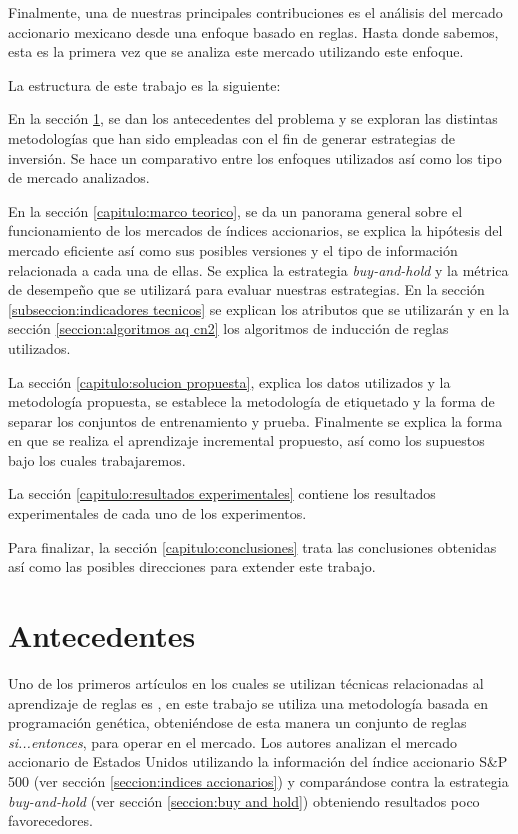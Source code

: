 \documentclass[12pt]{scrbook}
\theoremstyle{break}
\theoremstyle{break}
\newcommand{\buyhold}{\textit{buy-and-hold} }
\begin{document}
Finalmente, una de nuestras principales contribuciones es el análisis del mercado accionario mexicano desde una enfoque basado en reglas. Hasta donde sabemos, esta es la primera vez que se analiza este mercado utilizando este enfoque.

La estructura de este trabajo es la siguiente:

En la sección \ref{capitulo:antecedentes}, se dan los antecedentes del problema y se exploran las distintas metodologías que han sido empleadas con el fin de generar estrategias de inversión. Se hace un comparativo entre los enfoques utilizados así como los tipo de mercado analizados.

En la sección \ref{capitulo:marco teorico}, se da un panorama general sobre el funcionamiento de los mercados de índices accionarios, se explica la hipótesis del mercado eficiente así como sus posibles versiones y el tipo de información relacionada a cada una de ellas. Se explica la estrategia \buyhold y la métrica de desempeño que se utilizará para evaluar nuestras estrategias. En la sección \ref{subseccion:indicadores tecnicos} se explican los atributos que se utilizarán y en la sección \ref{seccion:algoritmos aq cn2} los algoritmos de inducción de reglas utilizados.

La sección \ref{capitulo:solucion propuesta}, explica los datos utilizados y la metodología propuesta, se establece la metodología de etiquetado y la forma de separar los conjuntos de entrenamiento y prueba. Finalmente se explica la forma en que se realiza el aprendizaje incremental propuesto, así como los supuestos bajo los cuales trabajaremos.

La sección \ref{capitulo:resultados experimentales} contiene los resultados experimentales de cada uno de los experimentos.

Para finalizar, la sección \ref{capitulo:conclusiones} trata las conclusiones obtenidas así como las posibles direcciones para extender este trabajo.




\chapter{Antecedentes}
\label{capitulo:antecedentes}
Uno de los primeros artículos en los cuales se utilizan técnicas relacionadas al aprendizaje de reglas es \cite{Allen1999}, en este trabajo se utiliza una metodología basada en programación genética, obteniéndose de esta manera un conjunto de reglas \textit{si...entonces}, para operar en el mercado. Los autores analizan el mercado accionario de Estados Unidos utilizando la información del índice accionario S\&P 500 (ver sección \ref{seccion:indices accionarios}) y comparándose contra la estrategia \buyhold (ver sección \ref{seccion:buy and hold}) obteniendo resultados poco favorecedores.
\end{document}
